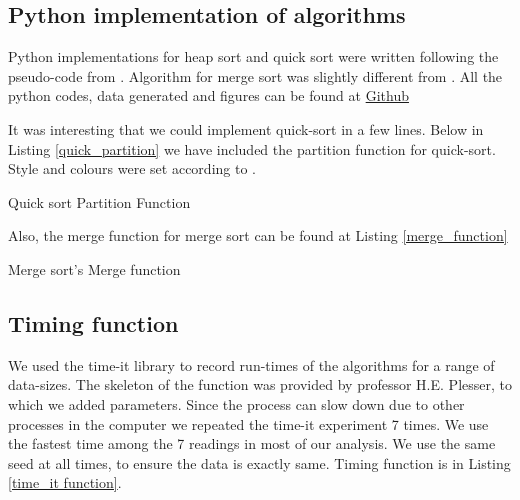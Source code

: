 \documentclass[sigconf, nonacm, natbib, screen, balance=False]{acmart}
\begin{document}
\subsection{Python implementation of algorithms}\label{sec:python implementation}

Python implementations for heap sort and quick sort were written following the pseudo-code from \citet{CLRS_2009}. Algorithm for merge sort was slightly different from \citet{CLRS_2009}. All the python codes, data generated and figures can be found at \href{https://github.com/vsnupoudel/termpaper01.}{Github} 

It was interesting that we could implement quick-sort in a few lines. Below in Listing \ref{quick_partition} we have included the partition function for quick-sort. Style and colours were set according to \citet{OverleafStyle}.

\begin{listing}
  \caption{Quick sort Partition Function}
  \label{quick_partition}

\end{listing}

Also, the merge function for merge sort can be found at Listing \ref{merge_function}

\begin{listing}
  \caption{Merge sort's Merge function}
  \label{merge_function}

\end{listing}

\subsection{Timing function}\label{sec:timing function}

We used the time-it library to record run-times of the algorithms for a range of data-sizes. The skeleton of the function was provided by professor H.E. Plesser, to which we added parameters. Since the process can slow down due to other processes in the computer we repeated the time-it experiment 7 times. We use the fastest time among the 7 readings in most of our analysis. We use the same seed at all times, to ensure the data is exactly same. Timing function is in Listing \ref{time_it function}.
\end{document}
